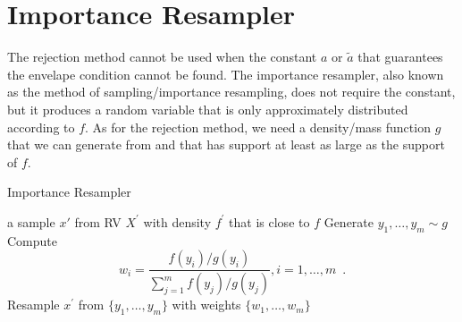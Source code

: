 \section{Importance Resampler}
The rejection method cannot be used when the constant $a$ or $\tilde{a}$ that guarantees the envelape condition cannot be found. The importance resampler, also known as the method of {sampling/importance resampling}, does not require the constant, but it produces a random variable that is only approximately distributed according to $f$. As for the rejection method, we need a density/mass function $g$ that we can generate from and that has support at least as large as the support of $f$.

\begin{algorithm}
\caption{Importance Resampler}
\label{A:ImpReSampler}
\begin{algorithmic}[1]
 a sample $x{\prime}$ from RV $X^{\prime}$ with density $f^{\prime}$ that is close to  $f$
\STATE Generate $y_1,\ldots, y_m \sim g$
\STATE Compute
$$
w_i=\frac{f(y_i)/g(y_i)}{\sum^m_{j=1}f(y_j)/g(y_j)},i=1,\ldots,m \enspace .
$$
\STATE Resample $x^{\prime}$ from $\{y_1,\ldots, y_m\}$ with weights $\{w_1,\ldots, w_m\}$
\end{algorithmic}
\end{algorithm}

